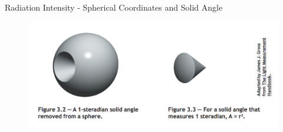 
\begin{frame}{Radiation Intensity - Spherical Coordinates  and Solid Angle}
\begin{figure}
	\includegraphics[width=\textwidth]{fig11.png}
\end{figure}
\end{frame}


